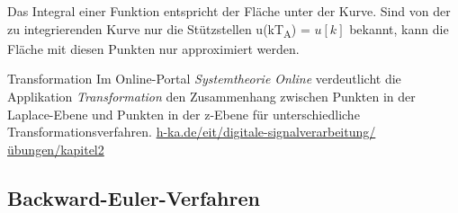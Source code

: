 Das Integral einer Funktion entspricht der Fläche unter der Kurve. Sind von der zu integrierenden Kurve nur die Stützstellen u(kT\textsubscript{A}) = \(u[k]\) bekannt, kann die Fläche mit diesen Punkten nur approximiert werden.

\begin{application}{Transformation}
  Im Online-Portal \emph{Systemtheorie Online} verdeutlicht die Applikation \emph{Transformation} den Zusammenhang zwischen Punkten in der Laplace-Ebene und Punkten in der z-Ebene für unterschiedliche Transformationsverfahren.
  \tcblower
  \url{h-ka.de/eit/digitale-signalverarbeitung/übungen/kapitel2}
\end{application}


\subsection{Backward-Euler-Verfahren}\label{sec:backward-euler-verfahren}

